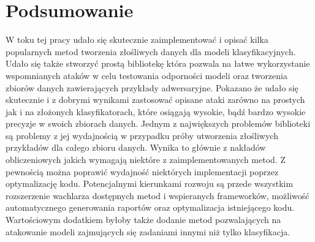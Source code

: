 \documentclass[
    left=2.5cm,         %
    right=2.5cm,        %
    top=2.5cm,          %
    bottom=3cm,         %
    bindingoffset=6mm,  %
    nohyphenation=false %
]{eiti/eiti-thesis}
\begin{document}
\newpage

\section{Podsumowanie}
W toku tej pracy udało się skutecznie zaimplementować i opisać kilka popularnych metod tworzenia złośliwych danych
dla modeli klasyfikacyjnych. Udało się także stworzyć prostą bibliotekę która pozwala na łatwe wykorzystanie wspomnianych ataków w celu
testowania odporności modeli oraz tworzenia zbiorów danych zawierających przykłady adwersaryjne.
Pokazano że udało się skutecznie i z dobrymi wynikami zastosować opisane ataki zarówno na prostych
jak i na złożonych klasyfikatorach, które osiągają wysokie, bądź bardzo wysokie precyzje w swoich zbiorach danych.
Jednym z największych problemów biblioteki są problemy z jej wydajnością w przypadku próby utworzenia złośliwych przykładów dla całego zbioru danych.
Wynika to głównie z nakładów obliczeniowych jakich wymagają niektóre z zaimplementowanych metod.
Z pewnością można poprawić wydajność niektórych implementacji poprzez optymalizację kodu.
Potencjalnymi kierunkami rozwoju są przede wszystkim rozszerzenie wachlarza dostępnych metod i wspieranych frameworków, możliwość automatycznego generowania raportów oraz optymalizacja istniejącego kodu.
Wartościowym dodatkiem byłoby także dodanie metod pozwalających na atakowanie modeli zajmujących się zadaniami innymi niż tylko klasyfikacja.




\cleardoublepage




\newpage
\pagestyle{plain}

\vspace{0.8cm}

\acronymlist
\end{document}
